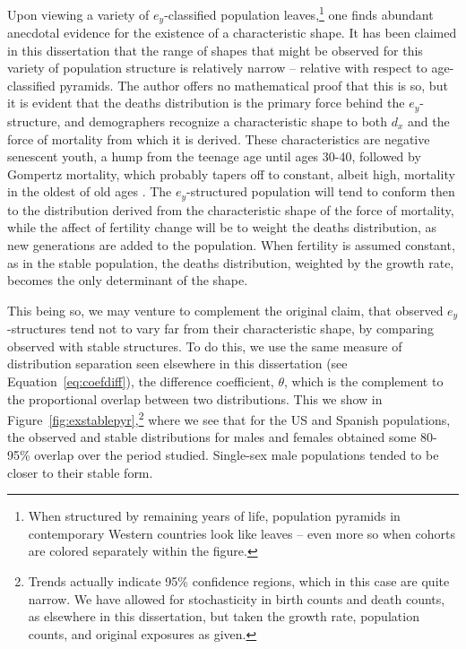  \FloatBarrier
Upon viewing a variety of $e_y$-classified population leaves,\footnote{When
structured by remaining years of life, population pyramids in contemporary
Western countries look like leaves -- even more so when cohorts are colored
separately within the figure. } one finds abundant anecdotal evidence for the
existence of a characteristic shape. It has been claimed in this dissertation 
that the range of shapes that might be observed for this variety of population 
structure is relatively narrow -- relative with respect to age-classified
pyramids. The author offers no mathematical proof that this is so, but it is evident 
that the deaths
distribution is the primary force behind the $e_y$-structure, and demographers
recognize a characteristic shape to both $d_x$ and the force of mortality from
which it is derived. These characteristics are negative senescent youth, a hump
from the teenage age until ages 30-40, followed by Gompertz mortality, which
probably tapers off to constant, albeit high, mortality in the oldest of
old ages \citep{horiuchi1998deceleration, vaupel1997trajectories}. The 
$e_y$-structured population will tend to conform then to the distribution derived from 
the characteristic shape of the force of mortality,
while the affect of fertility change will be to weight the deaths distribution,
as new generations are added to the population. When fertility is assumed
constant, as in the stable population, the deaths distribution, weighted by 
the growth rate, becomes the only determinant of the shape. 

This being so, we may venture to complement the original claim, that observed
$e_y$-structures tend not to vary far from their characteristic shape, by
comparing observed with stable structures. To do this, we use the same 
measure of distribution separation seen elsewhere in this dissertation (see
Equation~\eqref{eq:coefdiff}), the difference coefficient, $\theta$, which is
the complement to the proportional overlap between two distributions. This we show in
Figure~\ref{fig:exstablepyr},\footnote{Trends actually indicate 95\% confidence
regions, which in this case are quite narrow. We have allowed for
stochasticity in birth counts and death counts, as elsewhere in this
dissertation, but taken the growth rate, population counts, and original
exposures as given.} where we see that for the US and Spanish populations, the
observed and stable distributions for males and females obtained some 80-95\%
overlap over the period studied. Single-sex male populations tended to be closer
to their stable form.


